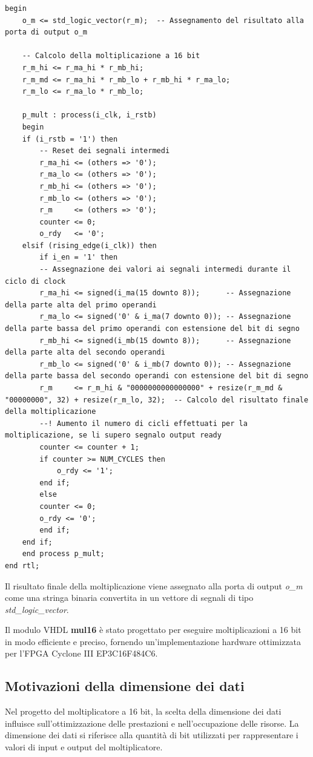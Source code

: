 \documentclass[titlepage]{report}
\begin{document}
\begin{lstlisting}[caption={\textbf{mul16.vhd} - architettura del motiplicatore a 16 bit}, label={lst:mul16_process}]
begin
	o_m <= std_logic_vector(r_m);  -- Assegnamento del risultato alla porta di output o_m

	-- Calcolo della moltiplicazione a 16 bit
	r_m_hi <= r_ma_hi * r_mb_hi;
	r_m_md <= r_ma_hi * r_mb_lo + r_mb_hi * r_ma_lo;
	r_m_lo <= r_ma_lo * r_mb_lo;

	p_mult : process(i_clk, i_rstb)
	begin
	if (i_rstb = '1') then
		-- Reset dei segnali intermedi
		r_ma_hi <= (others => '0');
		r_ma_lo <= (others => '0');
		r_mb_hi <= (others => '0');
		r_mb_lo <= (others => '0');
		r_m     <= (others => '0');
		counter <= 0;
		o_rdy   <= '0';
	elsif (rising_edge(i_clk)) then
		if i_en = '1' then
		-- Assegnazione dei valori ai segnali intermedi durante il ciclo di clock
		r_ma_hi <= signed(i_ma(15 downto 8));      -- Assegnazione della parte alta del primo operandi
		r_ma_lo <= signed('0' & i_ma(7 downto 0)); -- Assegnazione della parte bassa del primo operandi con estensione del bit di segno
		r_mb_hi <= signed(i_mb(15 downto 8));      -- Assegnazione della parte alta del secondo operandi
		r_mb_lo <= signed('0' & i_mb(7 downto 0)); -- Assegnazione della parte bassa del secondo operandi con estensione del bit di segno
		r_m     <= r_m_hi & "0000000000000000" + resize(r_m_md & "00000000", 32) + resize(r_m_lo, 32);  -- Calcolo del risultato finale della moltiplicazione
		--! Aumento il numero di cicli effettuati per la moltiplicazione, se li supero segnalo output ready
		counter <= counter + 1;
		if counter >= NUM_CYCLES then
			o_rdy <= '1';
		end if;
		else
		counter <= 0;
		o_rdy <= '0';
		end if;
	end if;
	end process p_mult;
end rtl;
		\end{lstlisting}
		
		Il risultato finale della moltiplicazione viene assegnato alla porta di output \textit{o\_m} come una stringa binaria convertita in un vettore di segnali di tipo \textit{std\_logic\_vector}.
		
		Il modulo VHDL \textbf{mul16} è stato progettato per eseguire moltiplicazioni a 16 bit in modo efficiente e preciso, fornendo un'implementazione hardware ottimizzata per l'FPGA Cyclone III EP3C16F484C6.
		
		\subsection*{Motivazioni della dimensione dei dati}
		\label{subsec:scelta_dimensione_dati}
			Nel progetto del moltiplicatore a 16 bit, la scelta della dimensione dei dati influisce sull'ottimizzazione delle prestazioni e nell'occupazione delle risorse. La dimensione dei dati si riferisce alla quantità di bit utilizzati per rappresentare i valori di input e output del moltiplicatore.
\end{document}
